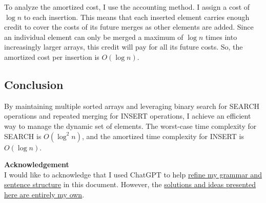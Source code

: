 \documentclass[10pt,letter,notitlepage]{article}
\begin{document}
\begin{Answer}
To analyze the amortized cost, I use the accounting method. I assign a cost of $\log n$ to each insertion. This means that each inserted element carries enough credit to cover the costs of its future merges as other elements are added. Since an individual element can only be merged a maximum of $\log n$ times into increasingly larger arrays, this credit will pay for all its future costs. So, the amortized cost per insertion is $O(\log n)$.

\subsection*{Conclusion}
By maintaining multiple sorted arrays and leveraging binary search for SEARCH operations and repeated merging for INSERT operations, I achieve an efficient way to manage the dynamic set of elements. The worst-case time complexity for SEARCH is $O(\log^2 n)$, and the amortized time complexity for INSERT is $O(\log n)$.


\end{Answer}

\vspace{+0.5cm}

\par \textbf{Acknowledgement}\\

I would like to acknowledge that I used ChatGPT to help \underline{refine my grammar and sentence structure} in this document. However, the \underline{solutions and ideas presented here are entirely my own}. 
\end{document}
